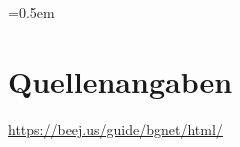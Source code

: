 \documentclass[11pt,a4paper]{article}
\begin{document}
\clearpage

\cite{boeing_engineers}
\cite{indian_overview}
\cite{sql_ideas}
\cite{avl_tree_wikipedia}

\emergencystretch=0.5em

\section{Quellenangaben}

\url{https://beej.us/guide/bgnet/html/}

\printbibliography[title={Literaturverzeichnis}]
\end{document}
